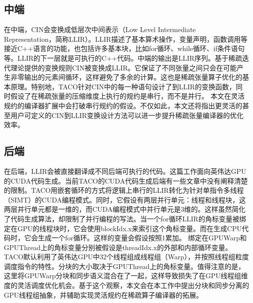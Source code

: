 \subsection{中端}
在中端，CIN会变换成低层次中间表示（Low Level Intermediate Representation，简称LLIR）。LLIR描述了基本算术操作，变量声明，函数调用等接近C++语言的功能，也包括许多基本块，比如for循环、while循环、if条件语句等。LLIR的下一层就是可执行的C++代码。中端的输出是LLIR序列。基于稀疏迭代理论\cite{kjolstad:2020:phd-thesis}提供的变换规则CIN被变换成LLIR。它保证了不同张量之间只会在可能产生非零输出的元素间循环，这样避免了多余的计算。这也是稀疏张量算子优化的基本原理。特别地，TACO针对CIN中的每一种语句设计了到LLIR的变换函数，同时假设了在稀疏张量的压缩维度上执行的规约是串行，而不是并行。
本文在灵活规约的编译器扩展中会打破串行规约的假设。不仅如此，本文还将指出更灵活的甚至用户可定义的CIN到LLIR变换设计方法可以进一步提升稀疏张量编译器的优化效率。
\subsection{后端}
在后端，LLIR会被直接翻译成不同后端可执行的代码。这篇工作面向英伟达GPU的CUDA代码生成。当前TACO的CUDA代码生成后端有一些文章中没有阐释清楚的限制。TACO用嵌套循环的方式\cite{senanayake:2020:scheduling}将逻辑上串行的LLIR转化为针对单指令多线程（SIMT）的CUDA编程模式。同时，它假设有两层并行单元：线程和线程块，这两层并行单元都是一维的，而CUDA编程模式中并行单元是3维的。这样虽然简化了代码生成算法，却限制了并行编程的写法。当一个for循环LLIR的角标变量被绑定在GPU的线程块时，它会使用blockIdx.x来索引这个角标变量。而在生成CPU代码时，它会生成一个for循环。这样的变量会假设按照1累加。
绑定在GPUWarp和GPUThread上的角标变量分别被假设是threadIdx.x的外部和内部循环变量。TACO默认利用了英伟达GPU中32个线程组成线程组（Warp），并按照线程组粒度调度指令的特性。分块的大小取决于GPUThread上的角标变量。值得注意的是，这里将GPUWarp分块和同步语义混合在了一起，这样导致损失了在GPU线程组维度的灵活调度优化机会。基于这个观察，本文会在本工作中提出分块和同步分离的GPU线程组抽象，并辅助实现灵活规约在稀疏算子编译器的拓展。

